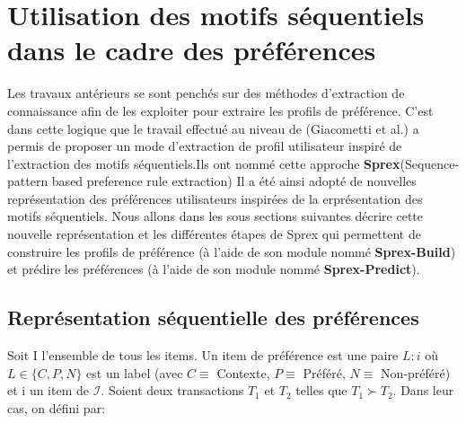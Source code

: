 \documentclass[a4paper,12pt,openany,oneside]{article}
\begin{document}
\section{Utilisation des motifs séquentiels dans le cadre des préférences}

Les travaux antérieurs se sont penchés sur des méthodes d'extraction de connaissance afin de les exploiter pour extraire les profils de préférence.
C'est dans cette logique que le travail effectué au niveau de (Giacometti et al.) a permis de proposer un mode d'extraction de profil utilisateur inspiré de l'extraction des motifs séquentiels.Ils ont nommé cette approche \textbf{Sprex}(Sequence-pattern based preference rule extraction)
Il a été ainsi adopté de nouvelles représentation des préférences utilisateurs inspirées de la erprésentation des motifs séquentiels.
Nous allons dans les sous sections suivantes décrire cette nouvelle représentation et les différentes étapes de Sprex qui permettent de construire les profils de préférence (à l'aide de son module nommé \textbf{Sprex-Build}) et prédire les préférences (à l'aide de son module nommé \textbf{Sprex-Predict}). 

\subsection{Représentation séquentielle des préférences}
Soit I l'ensemble de tous les items. Un item de préférence est une paire $L:i$ où $L\in \{C,P,N\}$ est un label (avec $C\equiv $ Contexte, $P\equiv $ Préféré, $N\equiv $ Non-préféré) et i un item de $\mathcal{I}$.
Soient deux transactions $T_1$ et $T_2$ telles que $T_1\succ T_2$. Dans leur cas, on défini par:
\end{document}
